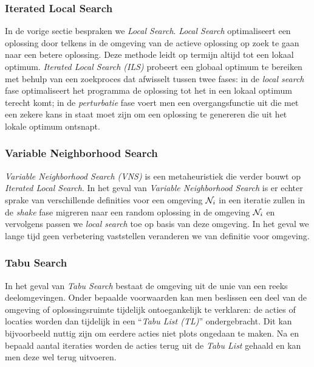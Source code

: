 \subsubsection{Iterated Local Search}

In de vorige sectie bespraken we \emph{Local Search}. \emph{Local Search} optimaliseert een oplossing door telkens in de omgeving van de actieve oplossing op zoek te gaan naar een betere oplossing. Deze methode leidt op termijn altijd tot een lokaal optimum. \emph{Iterated Local Search (ILS)} probeert een globaal optimum te bereiken met behulp van een zoekproces dat afwisselt tussen twee fases: in de \emph{local search} fase optimaliseert het programma de oplossing tot het in een lokaal optimum terecht komt; in de \emph{perturbatie} fase voert men een overgangsfunctie uit die met een zekere kans in staat moet zijn om een oplossing te genereren die uit het lokale optimum ontsnapt.\cite{stuetzle:1999,Glover2003}

\subsubsection{Variable Neighborhood Search}

\emph{Variable Neighborhood Search (VNS)} is een metaheuristiek die verder bouwt op \emph{Iterated Local Search}. In het geval van \emph{Variable Neighborhood Search} is er echter sprake van verschillende definities voor een omgeving $\mathcal{N}_i$ in een iteratie zullen in de \emph{shake} fase migreren naar een random oplossing in de omgeving $\mathcal{N}_i$ en vervolgens passen we \emph{local search} toe op basis van deze omgeving. In het geval we lange tijd geen verbetering vaststellen veranderen we van definitie voor omgeving.\cite{journals/eor/HansenM01}

\subsubsection{Tabu Search}
In het geval van \emph{Tabu Search} bestaat de omgeving uit de unie van een reeks deelomgevingen. Onder bepaalde voorwaarden kan men beslissen een deel van de omgeving of oplossingsruimte tijdelijk ontoegankelijk te verklaren: de acties of locaties worden dan tijdelijk in een ``\emph{Tabu List (TL)}'' ondergebracht. Dit kan bijvoorbeeld nuttig zijn om eerdere acties niet plots ongedaan te maken. Na en bepaald aantal iteraties worden de acties terug uit de \emph{Tabu List} gehaald en kan men deze wel terug uitvoeren.\cite{journals/cor/Glover86,DBLP:journals/informs/Glover89,citeulike:2634743,Glover:TabuSearch}

